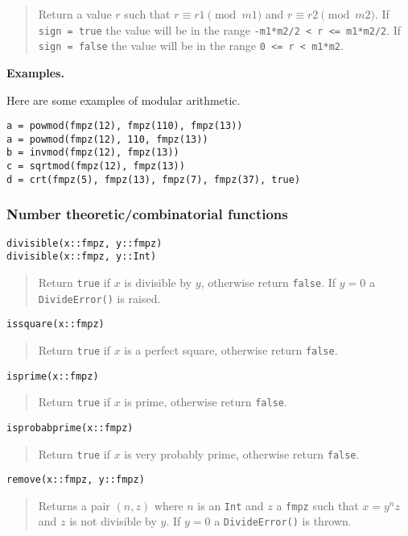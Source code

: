 \documentclass[a4paper,10pt]{article}
\newcommand{\code}{\lstinline}
\newcommand{\desc}[1]{\vspace{-3mm}\begin{quote}#1\end{quote}}
\begin{document}
{{\desc{Return a value $r$ such that $r \equiv r1 \pmod {m1}$ and $r \equiv r2 \pmod{m2}$.
If \code{sign = true} the value will be in the range \code{-m1*m2/2 < r <= m1*m2/2}. If
\code{sign = false} the value will be in the range \code{0 <= r < m1*m2}.}

\textbf{Examples.}

Here are some examples of modular arithmetic.

\begin{lstlisting}
a = powmod(fmpz(12), fmpz(110), fmpz(13))
a = powmod(fmpz(12), 110, fmpz(13))
b = invmod(fmpz(12), fmpz(13))
c = sqrtmod(fmpz(12), fmpz(13))
d = crt(fmpz(5), fmpz(13), fmpz(7), fmpz(37), true)
\end{lstlisting}

\subsubsection{Number theoretic/combinatorial functions}

\begin{lstlisting}
divisible(x::fmpz, y::fmpz)
divisible(x::fmpz, y::Int)
\end{lstlisting}

\desc{Return \code{true} if $x$ is divisible by $y$, otherwise return \code{false}. If
$y = 0$ a \code{DivideError()} is raised.}

\begin{lstlisting}
issquare(x::fmpz)
\end{lstlisting}

\desc{Return \code{true} if $x$ is a perfect square, otherwise return \code{false}.}

\begin{lstlisting}
isprime(x::fmpz)
\end{lstlisting}

\desc{Return \code{true} if $x$ is prime, otherwise return \code{false}.}

\begin{lstlisting}
isprobabprime(x::fmpz)
\end{lstlisting}

\desc{Return \code{true} if $x$ is very probably prime, otherwise return \code{false}.}

\begin{lstlisting}
remove(x::fmpz, y::fmpz)
\end{lstlisting}

\desc{Returns a pair $(n, z)$ where $n$ is an \code{Int} and $z$ a \code{fmpz} such that
$x = y^nz$ and $z$ is not divisible by $y$. If $y = 0$ a \code{DivideError()} is thrown.}

}}
\end{document}
